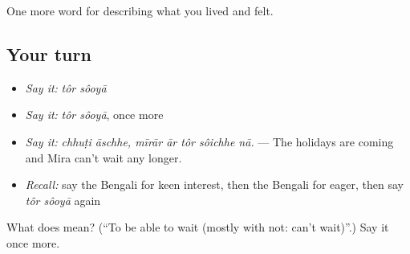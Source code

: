 \begin{grammarlens}[title={What you've built}]
One more word for describing what you lived and felt.
\end{grammarlens}

\subsection*{Your turn}
\begin{itemize}
\raggedright
  \item \emph{Say it:} \emph{tôr sôoyā}
  \item \emph{Say it:} \emph{tôr sôoyā}, once more
  \item \emph{Say it:} \emph{chhuṭi āschhe, mīrār ār tôr sôichhe nā.} — The holidays are coming and Mira can't wait any longer.
  \item \emph{Recall:} say the Bengali for keen interest, then the Bengali for eager, then say \emph{tôr sôoyā} again
\end{itemize}

\begin{tcolorbox}[breakable,colback=teal!4,colframe=teal!35!black,title={Before you move on}]
What does   mean? (\textquotedblleft{}To be able to wait (mostly with not: can't wait)\textquotedblright{}.) Say it once more.
\end{tcolorbox}
